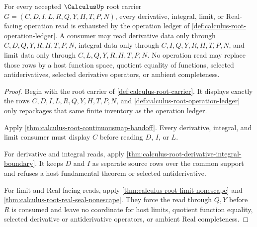 \begin{theorem}
\label{thm:calculus-root-operation-ledger-exhaustion}
For every accepted $\CalculusUp$ root carrier $G=(C,D,I,L,R,Q,Y,H,T,P,N)$, every derivative, integral, limit, or Real-facing operation read is exhausted by the operation ledger of \autoref{def:calculus-root-operation-ledger}. A consumer may read derivative data only through $C,D,Q,Y,R,H,T,P,N$, integral data only through $C,I,Q,Y,R,H,T,P,N$, and limit data only through $C,L,Q,Y,R,H,T,P,N$. No operation read may replace those rows by a host function space, quotient equality of functions, selected antiderivatives, selected derivative operators, or ambient completeness.
\end{theorem}
\begin{proof}
Begin with the root carrier of \autoref{def:calculus-root-carrier}. It displays exactly the rows $C,D,I,L,R,Q,Y,H,T,P,N$, and \autoref{def:calculus-root-operation-ledger} only repackages that same finite inventory as the operation ledger.

Apply \autoref{thm:calculus-root-continuousmap-handoff}. Every derivative, integral, and limit consumer must display $C$ before reading $D$, $I$, or $L$.

For derivative and integral reads, apply \autoref{thm:calculus-root-derivative-integral-boundary}. It keeps $D$ and $I$ as separate source rows over the common support and refuses a host fundamental theorem or selected antiderivative.

For limit and Real-facing reads, apply \autoref{thm:calculus-root-limit-nonescape} and \autoref{thm:calculus-root-real-seal-nonescape}. They force the read through $Q,Y$ before $R$ is consumed and leave no coordinate for host limits, quotient function equality, selected derivative or antiderivative operators, or ambient Real completeness.
\end{proof}

